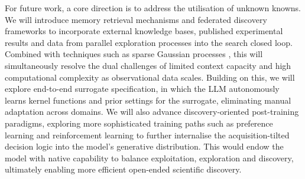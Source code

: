 For future work, a core direction is to address the utilisation of unknown knowns. We will introduce memory retrieval mechanisms and federated discovery frameworks to incorporate external knowledge bases, published experimental results and data from parallel exploration processes into the search closed loop. Combined with techniques such as sparse Gaussian processes \citep{snelsonSparseGaussianProcesses2005, titsiasVariationalLearningInducing2009}, this will simultaneously resolve the dual challenges of limited context capacity and high computational complexity as observational data scales. Building on this, we will explore end-to-end surrogate specification, in which the LLM autonomously learns kernel functions and prior settings for the surrogate, eliminating manual adaptation across domains. We will also advance discovery-oriented post-training paradigms, exploring more sophisticated training paths such as preference learning and reinforcement learning to further internalise the acquisition-tilted decision logic into the model’s generative distribution. This would endow the model with native capability to balance exploitation, exploration and discovery, ultimately enabling more efficient open-ended scientific discovery.

